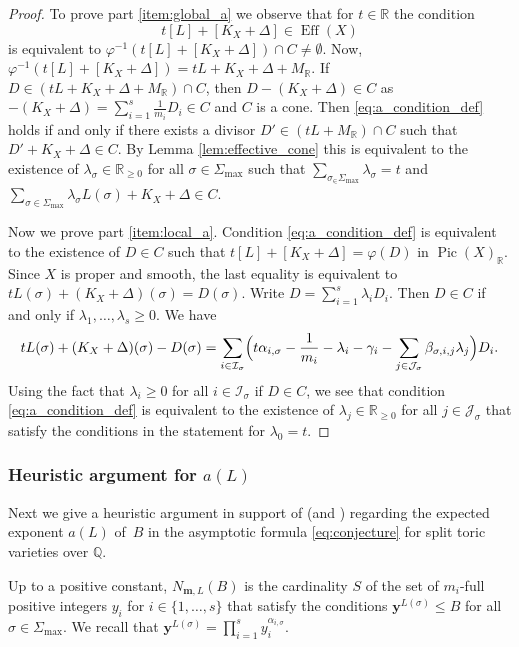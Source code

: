 \documentclass[JEP,XML,SOM,Unicode,published]{cedram}
\newcommand{\bfy}{\boldsymbol{y}}
\newcommand{\bfm}{{\boldsymbol{m}}}
\newcommand\RR{\mathbb{R}}
\newcommand\QQ{\mathbb{Q}}
\newcommand{\ii}[1]{\mathcal{J}_{#1}}
\newcommand{\ic}[1]{\mathcal{I}_{#1}}
\DeclareMathOperator{\pic}{Pic}
\DeclareMathOperator{\eff}{Eff}
\theoremstyle{definition}
\numberwithin{theorem}{section}
\begin{document}
\begin{proof}
To prove part \eqref{item:global_a} we observe that for $t\in\RR$ the condition
\begin{equation}
\label{eq:a_condition_def}
t[L]+[K_X+\Delta] \in \eff(X)
\end{equation}
is equivalent to $\varphi^{-1}(t[L]+[K_X+\Delta])\cap C\neq\emptyset$.
Now, $\varphi^{-1}(t[L]+[K_X+\Delta])=tL+K_X+\Delta+M_\RR$.
If $D\in (tL+K_X+\Delta+M_\RR)\cap C$, then $D-(K_X+\Delta)\in C$ as
$-(K_X+\Delta)=\sum_{i=1}^s\frac 1{m_i}D_i\in C$ and $C$ is a cone.
Then \eqref{eq:a_condition_def} holds if and only if there exists a divisor
$D'\in (tL+M_\RR)\cap C$ such that $D'+K_X+\Delta\in C$.
By Lemma \ref{lem:effective_cone} this is equivalent to the existence of
$\lambda_\sigma\in\RR_{\geq0}$ for all $\sigma\in\Sigma_{\max}$ such that
$\sum_{\sigma_\in\Sigma_{\max}}\lambda_\sigma=t$ and
$\sum_{\sigma\in\Sigma_{\max}}\lambda_\sigma L(\sigma)+K_X+\Delta\in C$.

Now we prove part \eqref{item:local_a}. Condition \eqref{eq:a_condition_def} is
equivalent to the existence of $D\in C$ such that $t[L]+[K_X+\Delta]=\varphi(D)$ in
$\pic(X)_\RR$. Since $X$ is proper and smooth, the last equality is
equivalent to $tL(\sigma)+(K_X+\Delta)(\sigma)=D(\sigma)$.
Write $D=\sum_{i=1}^s\lambda_i D_i$.
Then $D\in C$ if and only if $\lambda_1,\dots,\lambda_s\geq0$.
We have
\[
tL(\sigma)+(K_X+\Delta)(\sigma)-D(\sigma)
=\sum_{i\in\ic{\sigma}}\Bigl(t \alpha_{i,\sigma} -\frac 1{m_i}-\lambda_{i}-\gamma_i
-\sum_{j\in \ii{\sigma}}\beta_{\sigma,i,j}\lambda_j\Bigr)D_{i}.
\]
Using the fact that $\lambda_{i}\geq0$ for all $i\in\ic{\sigma}$ if $D\in C$,
we see that condition \eqref{eq:a_condition_def} is equivalent to the existence of
$\lambda_j\in\RR_{\geq0}$ for all $j\in\ii{\sigma}$ that satisfy the conditions in
the statement for $\lambda_0=t$.
\end{proof}

\subsubsection{Heuristic argument for $a(L)$}
Next we give a heuristic argument in support of \cite[Conj.\,1.1]{PSTVA}
(and \cite[\S3.3]{MR1032922})
regarding the expected exponent $a(L)$ of~$B$ in the asymptotic
formula \eqref{eq:conjecture} for split toric varieties over $\QQ$.

Up to a positive constant, $N_{\bfm,L}(B)$ is the cardinality $S$ of the set of $m_i$-full positive integers $y_i$ for $i\in\{1,\dots,s\}$ that satisfy the conditions $\bfy^{L(\sigma)}\leq B$ for all $\sigma\in\Sigma_{\max}$. We recall that $\bfy^{L(\sigma)}=\prod_{i=1}^s y_i^{\alpha_{i,\sigma}}$.
\end{document}
